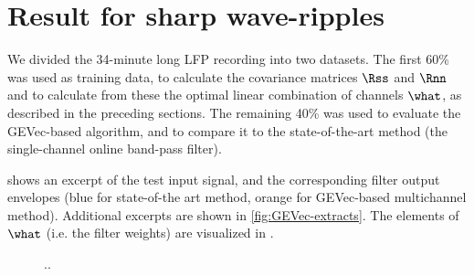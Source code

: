 \section{Result for sharp wave-ripples}

We divided the 34-minute long LFP recording into two datasets. The first 60\% was used as training data, to calculate the covariance matrices $\Rss$ and $\Rnn$ and to calculate from these the optimal linear combination of channels $\what$, as described in the preceding sections. The remaining 40\% was used to evaluate the GEVec-based algorithm, and to compare it to the state-of-the-art method (the single-channel online band-pass filter).

\begin{figure}
\label{fig:LSM-comp}
\end{figure}

 shows an excerpt of the test input signal, and the corresponding filter output envelopes (blue for state-of-the art method, orange for GEVec-based multichannel method). Additional excerpts are shown in \cref{fig:GEVec-extracts}. The elements of $\what$ (i.e. the filter weights) are visualized in .



\begin{figure}
\caption{..}
\label{fig:LSM-PR-and-latency}
\end{figure}
